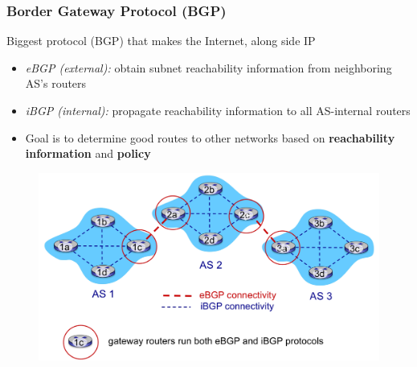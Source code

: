 \documentclass{article}
\begin{document}
\subsubsection{Border Gateway Protocol (BGP)}
Biggest protocol (BGP) that makes the Internet, along side IP
\begin{itemize}
    \item \textit{eBGP (external):} obtain subnet reachability information from neighboring AS's
    routers
    \item \textit{iBGP (internal):} propagate reachability information to all AS-internal routers
    \item Goal is to determine good routes to other networks based on \textbf{reachability information} 
    and \textbf{policy}
\end{itemize}
\begin{figure}[htbp]
    \centering
    \includegraphics[width=1\textwidth]{interASconnection.png}
\end{figure}
\end{document}
